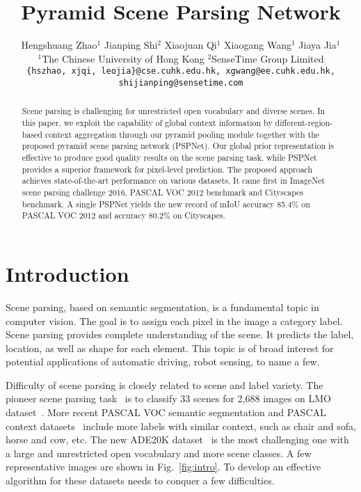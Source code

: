 \documentclass[10pt,twocolumn,letterpaper]{article}
\begin{document}
\title{Pyramid Scene Parsing Network}


\author{
Hengshuang Zhao$^{1}$ \quad Jianping Shi$^{2}$ \quad Xiaojuan Qi$^{1}$ \quad Xiaogang Wang$^{1}$ \quad Jiaya Jia$^{1}$\\
$^{1}$The Chinese University of Hong Kong \quad $^{2}$SenseTime Group Limited\\
{\tt\small \{hszhao, xjqi, leojia\}@cse.cuhk.edu.hk, xgwang@ee.cuhk.edu.hk, shijianping@sensetime.com}}

\maketitle

\begin{abstract}
Scene parsing is challenging for unrestricted open vocabulary and diverse scenes. In this
paper, we exploit the capability of global context information by different-region-based
context aggregation through our pyramid pooling module together with the proposed pyramid
scene parsing network (PSPNet). Our global prior representation is effective to produce
good quality results on the scene parsing task, while PSPNet provides a superior
framework for pixel-level prediction. The proposed approach achieves state-of-the-art
performance on various datasets. It came first in ImageNet scene parsing challenge 2016,
PASCAL VOC 2012 benchmark and Cityscapes benchmark. A single PSPNet yields the new record
of mIoU accuracy 85.4\% on PASCAL VOC 2012 and accuracy 80.2\% on Cityscapes.
\end{abstract}


\section{Introduction}

Scene parsing, based on semantic segmentation, is a fundamental topic in computer vision.
The goal is to assign each pixel in the image a category label. Scene parsing provides
complete understanding of the scene. It predicts the label, location, as well as shape
for each element. This topic is of broad interest for potential applications of automatic
driving, robot sensing, to name a few.

Difficulty of scene parsing is closely related to scene and label variety. The pioneer
scene parsing task~\cite{liu2011nonparametric} is to classify 33 scenes for 2,688 images
on LMO dataset~\cite{liu2009nonparametric}. More recent PASCAL VOC semantic segmentation
and PASCAL context datasets~\cite{everingham2010pascal,mottaghi2014role} include more
labels with similar context, such as chair and sofa, horse and cow, etc. The new ADE20K
dataset~\cite{zhou2016semantic} is the most challenging one with a large and unrestricted
open vocabulary and more scene classes. A few representative images are shown in
Fig.~\ref{fig:intro}. To develop an effective algorithm for these datasets needs to
conquer a few difficulties.
\end{document}

